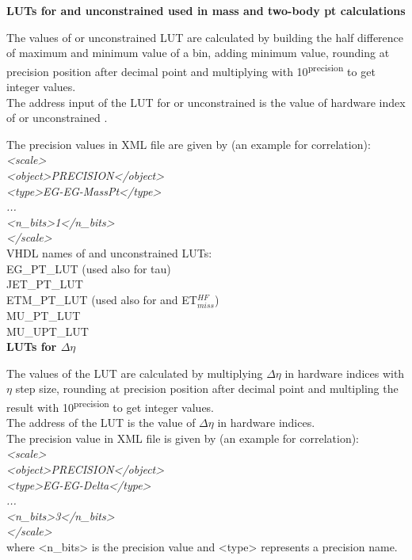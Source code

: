 \textbf{LUTs for \pt and unconstrained \pt used in mass and two-body pt calculations}
\label{sec:gtl:calc_luts_pt}

The values of \pt or unconstrained \pt LUT are calculated by building the half difference of maximum and minimum value of a bin, adding minimum value, rounding at precision position after decimal point and multiplying with 10\textsuperscript{\tiny{precision}} to get integer values.\\
The address input of the LUT for \pt or unconstrained \pt is the value of hardware index of \pt or unconstrained \pt.

The precision values in XML file are given by (an example for \egamma \egamma correlation):\\
\textit{<scale>\\
    <object>PRECISION</object>\\
    <type>EG-EG-MassPt</type>\\
    ...\\
    <n\_bits>1</n\_bits>\\
</scale>}\\

VHDL names of \pt and unconstrained \pt LUTs:\\
EG\_PT\_LUT (used also for tau)\\
JET\_PT\_LUT\\
ETM\_PT\_LUT (used also for \htm and ET$_{miss}^{HF}$)\\
MU\_PT\_LUT\\
MU\_UPT\_LUT\\

\textbf{LUTs for $\Delta\eta$}
\label{sec:gtl:calc_luts_delta_eta}

The values of the LUT are calculated by multiplying $\Delta\eta$ in hardware indices with $\eta$ step size, rounding at precision position after decimal point and multipling the result with 10\textsuperscript{\tiny{precision}} to get integer values.\\
The address of the LUT is the value of $\Delta\eta$ in hardware indices.\\

The precision value in XML file is given by (an example for \egamma \egamma correlation):\\
\textit{<scale>\\
    <object>PRECISION</object>\\
    <type>EG-EG-Delta</type>\\
    ...\\
    <n\_bits>3</n\_bits>\\
</scale>}\\
where <n\_bits> is the precision value and <type> represents a precision name.\\

